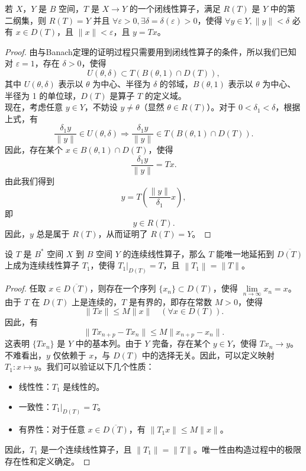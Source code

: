 \documentclass[lang=cn,newtx,10pt,scheme=chinese,thmcnt=chapter]{elegantbook}
\begin{document}
\begin{theorem}[闭线性算子的定理]
若 $X$，$Y$ 是 $B$ 空间，$T$ 是 $X \to Y$ 的一个闭线性算子，满足 $R(T)$ 是 $Y$ 中的第二纲集，则 $R(T) = Y$ 并且 $\forall \varepsilon > 0, \exists \delta = \delta(\varepsilon) > 0$，使得 $\forall y \in Y, \|y\| < \delta$ 必有 $x \in D(T)$，且 $\|x\| < \varepsilon$，且 $y = T x$。
\end{theorem}
\begin{proof}
由与Banach定理的证明过程只需要用到闭线性算子的条件，所以我们已知对 $\varepsilon = 1$，存在 $\delta > 0$，使得
\[
U(\theta, \delta) \subset T(B(\theta, 1) \cap D(T)),
\]
其中 $U(\theta, \delta)$ 表示以 $\theta$ 为中心、半径为 $\delta$ 的邻域，$B(\theta, 1)$ 表示以 $\theta$ 为中心、半径为 1 的单位球，$D(T)$ 是算子 $T$ 的定义域。\\
\noindent 现在，考虑任意 $y \in Y$，不妨设 $y \neq \theta$（显然 $\theta \in R(T)$）。对于 $0 < \delta_1 < \delta$，根据上式，有
\[
\frac{\delta_1 y}{\|y\|} \in U(\theta, \delta) \Longrightarrow \frac{\delta_1 y}{\|y\|} \in T(B(\theta, 1) \cap D(T)).
\]
因此，存在某个 $x \in B(\theta, 1) \cap D(T)$，使得
\[
\frac{\delta_1 y}{\|y\|} = T x.
\]
由此我们得到
\[
y = T\left(\frac{\|y\|}{\delta_1} x\right),
\]
即
\[
y \in R(T).
\]
因此，$y$ 总是属于 $R(T)$，从而证明了 $R(T) = Y$。
\end{proof}
\begin{theorem}[线性算子的延拓]
设 $T$ 是 $B^*$ 空间 $X$ 到 $B$ 空间 $Y$ 的连续线性算子，那么 $T$ 能唯一地延拓到 $\overline{D(T)}$ 上成为连续线性算子 $T_1$，使得 $\left.T_1\right|_{D(T)} = T$，且 $\left\|T_1\right\| = \|T\|$。
\end{theorem}

\begin{proof}
任取 $x \in \overline{D(T)}$，则存在一个序列 $\{x_n\} \subset D(T)$，使得 $\lim\limits_{n \to \infty} x_n = x$。由于 $T$ 在 $D(T)$ 上是连续的，$T$ 是有界的，即存在常数 $M > 0$，使得
\[
\|T x\| \leqslant M \|x\| \quad (\forall x \in D(T)).
\]
因此，有
\[
\|T x_{n+p} - T x_n\| \leqslant M \|x_{n+p} - x_n\|.
\]
这表明 $\{T x_n\}$ 是 $Y$ 中的基本列。由于 $Y$ 完备，存在某个 $y \in Y$，使得 $T x_n \to y$。
不难看出，$y$ 仅依赖于 $x$，与 $D(T)$ 中的选择无关。因此，可以定义映射 $T_1: x \mapsto y$。我们可以验证以下几个性质：
\begin{itemize}
    \item 线性性：$T_1$ 是线性的。
    \item 一致性：$\left.T_1\right|_{D(T)} = T$。
    \item 有界性：对于任意 $x \in \overline{D(T)}$，有 $\|T_1 x\| \leqslant M \|x\|$。
\end{itemize}
因此，$T_1$ 是一个连续线性算子，且 $\|T_1\| = \|T\|$。唯一性由构造过程中的极限存在性和定义确定。

\end{proof}
\end{document}
